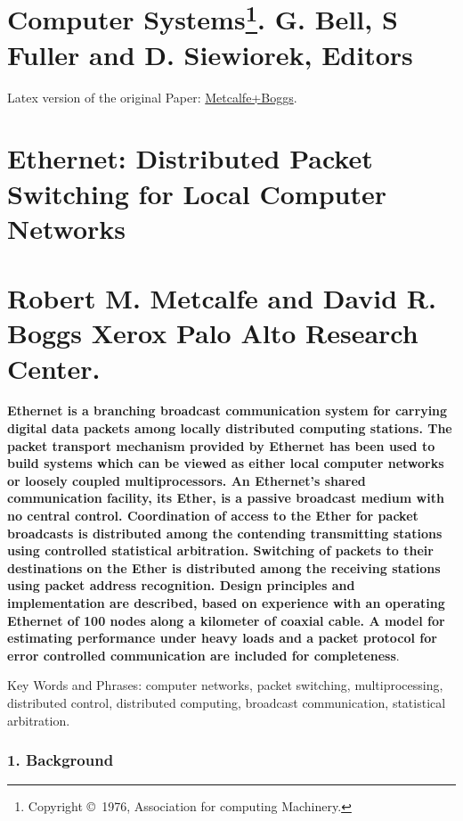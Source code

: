 \section*{\small Computer Systems\footnote{Copyright \copyright ~1976, Association for computing Machinery.}.  G. Bell, S Fuller and D. Siewiorek, Editors}
\bigskip
Latex version of the original Paper: \href{https://dl.acm.org/doi/pdf/10.1145/360248.360253}{Metcalfe+Boggs}.
\section*{\Huge Ethernet: Distributed Packet Switching for Local Computer Networks}
\bigskip
\section*{Robert M. Metcalfe and David R. Boggs Xerox Palo Alto Research Center.}
\bigskip \bigskip \bigskip

\textbf{Ethernet is a branching broadcast communication system for carrying digital data packets among locally distributed computing stations. The packet transport mechanism provided by Ethernet has been used to build systems which can be viewed as either local computer networks or loosely coupled multiprocessors. An Ethernet's shared communication facility, its Ether, is a passive broadcast medium with no central control. Coordination of access to the Ether for packet broadcasts is distributed among the contending transmitting stations using controlled statistical arbitration. Switching of packets to their destinations on the Ether is distributed among the receiving stations using packet address recognition. Design principles and implementation are described, based on experience with an operating Ethernet of 100 nodes along a kilometer of coaxial cable. A model for estimating performance under heavy loads and a packet protocol for error controlled communication are included for completeness}.
\bigskip

{\small Key Words and Phrases: computer networks, packet switching, multiprocessing, distributed control, distributed computing, broadcast communication, statistical arbitration.}

\vspace{\fill} \pagebreak

\columnbreak
\subsubsection*{1. Background}
\vspace{-6pt}

